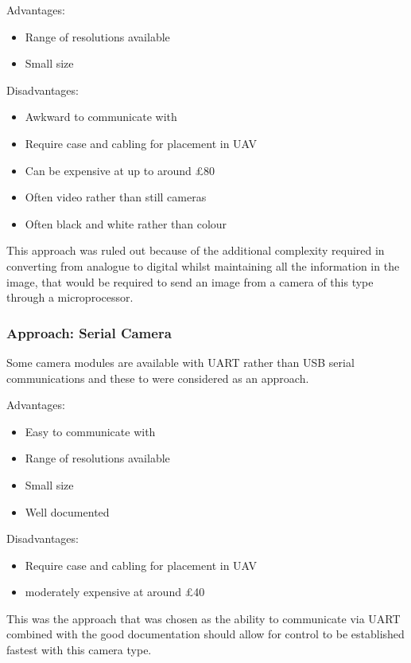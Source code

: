Advantages:
      \begin{itemize}
         \item Range of resolutions available
		 \item Small size
     \end{itemize}

Disadvantages:
     \begin{itemize}
        \item Awkward to communicate with
        \item Require case and cabling for placement in UAV
		\item Can be expensive at up to around £80
		\item Often video rather than still cameras
		\item Often black and white rather than colour
     \end{itemize}

This approach was ruled out because of the additional complexity required in converting from analogue to digital whilst maintaining all the information in the image, that would be required to send an image from a camera of this type through a microprocessor.

\subsubsection{Approach: Serial Camera}
\label{sec:Serial_option}
Some camera modules are available with UART rather than USB serial communications and these to were considered as an approach.

Advantages:
      \begin{itemize}
		 \item Easy to communicate with
         \item Range of resolutions available
		 \item Small size
		 \item Well documented
     \end{itemize}

Disadvantages:
     \begin{itemize}
        \item Require case and cabling for placement in UAV
		\item moderately expensive at around £40
     \end{itemize}

This was the approach that was chosen as the ability to communicate via UART combined with the good documentation should allow for control to be established fastest with this camera type.